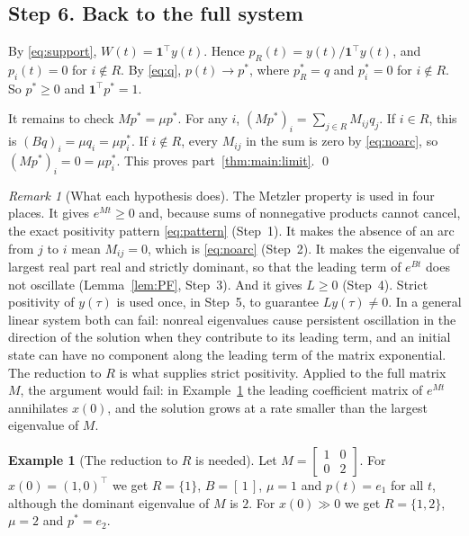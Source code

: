 \documentclass[11pt]{article}
\theoremstyle{definition}
\newtheorem{example}[theorem]{Example}
\theoremstyle{remark}
\newtheorem{remark}[theorem]{Remark}
\newcommand{\one}{\mathbf{1}}
\newcommand{\T}{\top}
\begin{document}
\subsection*{Step 6. Back to the full system}

By \eqref{eq:support}, $W(t) = \one^\T y(t)$. Hence $p_R(t) = y(t)/\one^\T y(t)$, and $p_i(t) = 0$
for $i \notin R$. By \eqref{eq:q}, $p(t) \to p^*$, where $p^*_R = q$ and $p^*_i = 0$ for
$i \notin R$. So $p^* \ge 0$ and $\one^\T p^* = 1$.

It remains to check $M p^* = \mu p^*$. For any $i$, $(M p^*)_i = \sum_{j \in R} M_{ij} q_j$.
If $i \in R$, this is $(Bq)_i = \mu q_i = \mu p^*_i$. If $i \notin R$, every $M_{ij}$ in the sum is
zero by \eqref{eq:noarc}, so $(M p^*)_i = 0 = \mu p^*_i$. This proves
part~\ref{thm:main:limit}. \qed

\begin{remark}[What each hypothesis does]\label{rem:roles}
The Metzler property is used in four places. It gives $e^{Mt} \ge 0$ and, because sums of
nonnegative products cannot cancel, the exact positivity pattern \eqref{eq:pattern} (Step~1). It
makes the absence of an arc from $j$ to $i$ mean $M_{ij} = 0$, which is \eqref{eq:noarc} (Step~2).
It makes the eigenvalue of largest real part real and strictly dominant, so that the leading term
of $e^{Bt}$ does not oscillate (Lemma~\ref{lem:PF}, Step~3). And it gives $L \ge 0$ (Step~4). Strict positivity of
$y(\tau)$ is used once, in Step~5, to guarantee $L y(\tau) \ne 0$. In a general linear system both
can fail: nonreal eigenvalues cause persistent oscillation in the direction of the solution when
they contribute to its leading term, and an initial state can have no component along the leading
term of the matrix exponential. The reduction to $R$ is what supplies strict positivity. Applied
to the full matrix $M$, the argument would fail: in Example~\ref{ex:reduction} the leading
coefficient matrix of $e^{Mt}$ annihilates $x(0)$, and the solution grows at a rate smaller than
the largest eigenvalue of $M$.
\end{remark}

\begin{example}[The reduction to $R$ is needed]\label{ex:reduction}
Let $M = \begin{bmatrix} 1 & 0 \\ 0 & 2 \end{bmatrix}$. For $x(0) = (1, 0)^\T$ we get $R = \{1\}$,
$B = [\,1\,]$, $\mu = 1$ and $p(t) = e_1$ for all $t$, although the dominant eigenvalue of $M$ is
$2$. For $x(0) \gg 0$ we get $R = \{1,2\}$, $\mu = 2$ and $p^* = e_2$.
\end{example}
\end{document}
